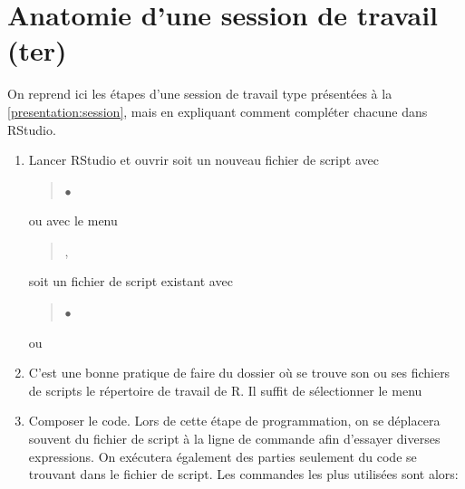 \section{Anatomie d'une session de travail (ter)}
\label{rstudio:session}

On reprend ici les étapes d'une %
session de travail %
type présentées à la \autoref{presentation:session}, mais en
expliquant comment compléter chacune dans RStudio.

\begin{enumerate}
\item Lancer RStudio et ouvrir soit un nouveau fichier de script avec
  \begin{quote}
     $\bullet$ 
  \end{quote}
  ou avec le menu
  \begin{quote}
    ,
  \end{quote}
  soit un fichier de script existant avec
  \begin{quote}
     $\bullet$ 
  \end{quote}
  ou
  \begin{quote}
  \end{quote}
\item C'est une bonne pratique de faire du dossier où se trouve son ou
  ses fichiers de scripts le répertoire de travail de R. Il suffit de
  sélectionner le menu
  \begin{quote}
  \end{quote}
\item Composer le code. Lors de cette étape de programmation, on se
  déplacera souvent du fichier de script à la ligne de commande afin
  d'essayer diverses expressions. On exécutera également des parties
  seulement du code se trouvant dans le fichier de script. Les
  commandes les plus utilisées sont alors:
  \begin{quote}
\end{quote}
\end{enumerate}
